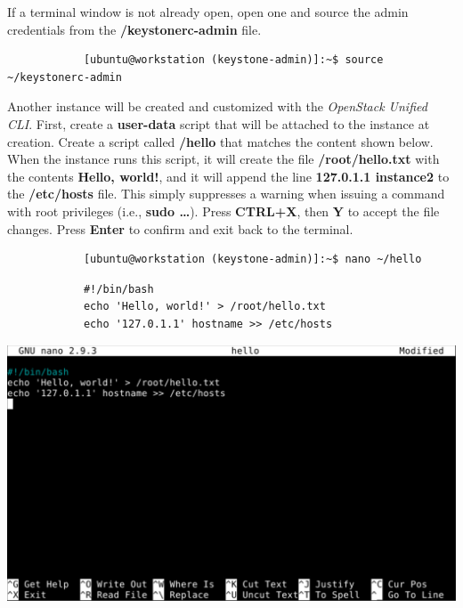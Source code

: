 \documentclass[letterpaper, 12pt]{article}
\begin{document}
\begin{enumerate}
    \begin{labstep}
        If a terminal window is not already open, open one and source the admin credentials from the \textbf{\texttildemid/keystonerc-admin} file.
        \begin{lstlisting}
            [ubuntu@workstation (keystone-admin)]:~$ source ~/keystonerc-admin
        \end{lstlisting}
    \end{labstep}

    \begin{labstep}
        Another instance will be created and customized with the \textit{OpenStack Unified CLI}.
        First, create a \textbf{user-data} script that will be attached to the instance at creation.
        Create a script called \textbf{\texttildemid/hello} that matches the content shown below.
        When the instance runs this script, it will create the file \textbf{/root/hello.txt} with the contents \textbf{Hello, world!}, and it will append the line \textbf{127.0.1.1 instance2} to the \textbf{/etc/hosts} file.
        This simply suppresses a warning when issuing a command with root privileges (i.e., \textbf{sudo …}).
        Press \textbf{CTRL+X}, then \textbf{Y} to accept the file changes.
        Press \textbf{Enter} to confirm and exit back to the terminal.
        \begin{lstlisting}
            [ubuntu@workstation (keystone-admin)]:~$ nano ~/hello
        \end{lstlisting}
        \begin{lstlisting}
            #!/bin/bash
            echo 'Hello, world!' > /root/hello.txt
            echo '127.0.1.1' hostname >> /etc/hosts
        \end{lstlisting}

        \begin{center}
            \includegraphics[width=\linewidth]{images/part3/step2.png}
        \end{center}
    \end{labstep}


\end{enumerate}
\end{document}
